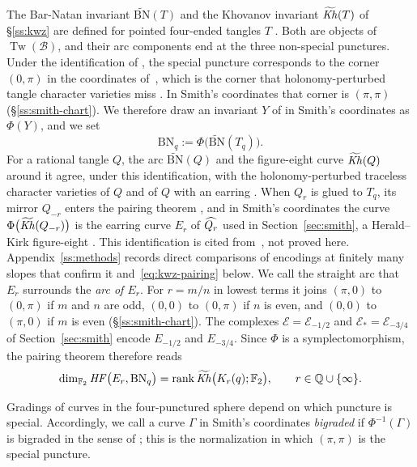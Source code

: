 The Bar-Natan invariant $\widetilde{\mathrm{BN}}(T)$ and the Khovanov invariant $\widetilde{\mathit{Kh}}(T)$ of
\S\ref{ss:kwz} are defined for pointed four-ended tangles $T$ \cite[Def.~6.5]{KWZ}.  Both are objects of
$\operatorname{Tw}(\mathcal B)$, and their arc components end at the three non-special punctures.  Under the identification of
\cite[\S8.2]{KWZ}, the special puncture corresponds to the
corner $(0,\pi)$ in the coordinates of~\cite{CHKK}, which is the corner that
holonomy-perturbed tangle character varieties miss \cite[Prop.~11.1 and \S11.6]{CHKK}.  In Smith's coordinates
that corner is $(\pi,\pi)$ (\S\ref{ss:smith-chart}).  We therefore draw an invariant $Y$ of \cite{KWZ} in Smith's
coordinates as $\Phi(Y)$, and we set
\[
 \mathrm{BN}_q:=\Phi\bigl(\widetilde{\mathrm{BN}}(T_q)\bigr).
\]
For a rational tangle $Q$, the arc $\widetilde{\mathrm{BN}}(Q)$ and the figure-eight curve
$\widetilde{\mathit{Kh}}(Q)$ around it agree, under this identification, with the holonomy-perturbed traceless
character varieties of $Q$ and of $Q$ with an earring \cite[\S1.8; for $\widetilde{\mathrm{BN}}$ also \S8.2,
Prop.~8.3]{KWZ}.  When $Q_r$ is glued to $T_q$, its
mirror $Q_{-r}$ enters the pairing theorem \cite[Thm.~1.9]{KWZ}, and in Smith's coordinates the curve
$\Phi\bigl(\widetilde{\mathit{Kh}}(Q_{-r})\bigr)$ is the earring curve $E_r$ of $\widehat{Q_{r}}$ used in
Section~\ref{sec:smith}, a Herald--Kirk figure-eight \cite[Def.~6.7]{HK}.  This identification is cited
from~\cite[\S1.8; for $\widetilde{\mathrm{BN}}$ also \S8.2, Prop.~8.3]{KWZ}, not proved here.
Appendix~\ref{ss:methods} records direct comparisons of encodings at finitely many slopes that confirm it
and~\eqref{eq:kwz-pairing} below.  We call the straight arc that $E_r$
surrounds the \emph{arc of $E_r$}.  For $r=m/n$ in lowest terms it joins $(\pi,0)$ to $(0,\pi)$ if $m$
and $n$ are odd, $(0,0)$ to $(0,\pi)$ if $n$ is even, and $(0,0)$ to $(\pi,0)$ if $m$ is even
(\S\ref{ss:smith-chart}).  The complexes $\mathcal E=\mathcal E_{-1/2}$ and $\mathcal E_*=\mathcal E_{-3/4}$
of Section~\ref{sec:smith} encode $E_{-1/2}$ and $E_{-3/4}$.  Since $\Phi$ is a symplectomorphism, the
pairing theorem therefore reads
\begin{equation}\label{eq:kwz-pairing}
 \dim_{\mathbb{F}_2}\mathit{HF}\bigl(E_r,\mathrm{BN}_q\bigr)=\operatorname{rank}\widetilde{\mathit{Kh}}\bigl(K_r(q);\mathbb{F}_2\bigr),
 \qquad r\in\mathbb{Q}\cup\{\infty\}.
\end{equation}

Gradings of curves in the four-punctured sphere depend on which puncture is special.  Accordingly, we call a
curve $\Gamma$ in Smith's coordinates \emph{bigraded} if $\Phi^{-1}(\Gamma)$ is bigraded in the sense of \cite{KWZ}; this is the
normalization in which $(\pi,\pi)$ is the special puncture.

